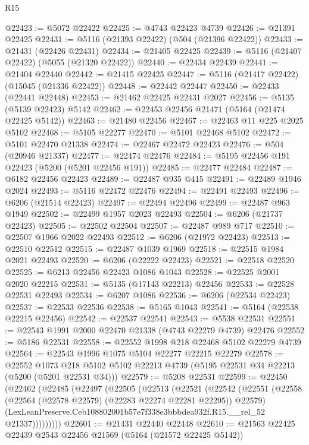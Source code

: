 \begin{lexlean}{R15}
\begin{coremodule}
{{{{{{{{{{{@22423 := @5072 @22422
@22425 := @4743 @22423 @4739
@22426 := @21391 @22425
@22431 := @5116 (@21393 @22422) (@504 (@21396 @22422))
@22433 := @21431 (@22426 @22431)
@22434 := @21405 @22425
@22439 := @5116 (@21407 @22422) (@5055 (@21320 @22422))
@22440 := @22434 @22439
@22441 := @21404 @22440
@22442 := @21415 @22425
@22447 := @5116 (@21417 @22422) (@15045 (@21336 @22422))
@22448 := @22442 @22447
@22450 := @22433 (@22441 @22448)
@22453 := @21462 @22425 @22431 @2027
@22456 := @5135 (@5139 @22423) @5142
@22462 := @22453 @22456 @21471 (@5164 (@21474 @22425 @5142))
@22463 := @21480 @22456
@22467 := @22463 @11 @225 @2025 @5102
@22468 := @5105 @22277
@22470 := @5101 @22468 @5102
@22472 := @5101 @22470 @21338
@22474 := @22467 @22472 @22423
@22476 := @504 (@20946 @21337)
@22477 := @22474 @22476
@22484 := @5195 @22456 @191 @22423 (@5200 (@5201 @22456 @191))
@22485 := @22477 @22484
@22487 := @6182 @22456 @22423
@22489 := @22487 @935 @415
@22491 := @22489 @1946 @2024
@22493 := @5116 @22472 @22476
@22494 := @22491 @22493
@22496 := @6206 (@21514 @22423)
@22497 := @22494 @22496
@22499 := @22487 @963 @1949
@22502 := @22499 @1957 @2023 @22493
@22504 := @6206 (@21737 @22423)
@22505 := @22502 @22504
@22507 := @22487 @989 @717
@22510 := @22507 @1966 @2022 @22493
@22512 := @6206 (@21972 @22423)
@22513 := @22510 @22512
@22515 := @22487 @1039 @1969
@22518 := @22515 @1984 @2021 @22493
@22520 := @6206 (@22222 @22423)
@22521 := @22518 @22520
@22525 := @6213 @22456 @22423 @1086 @1043
@22528 := @22525 @2001 @2020 @22215
@22531 := @5135 (@17143 @22213) @22456
@22533 := @22528 @22531 @22493
@22534 := @6207 @1086
@22536 := @6206 (@22534 @22423)
@22537 := @22533 @22536
@22538 := @5165 @1043
@22541 := @5164 (@22538 @22215 @22456)
@22542 := @22537 @22541
@22543 := @5538 @22531
@22551 := @22543 @1991 @2000 @22470 @21338 (@4743 @22279 @4739) @22476
@22552 := @5186 @22531
@22558 := @22552 @1998 @218 @22468 @5102 @22279 @4739
@22564 := @22543 @1996 @1075 @5104 @22277 @22215 @22279
@22578 := @22552
    @1073
    @218
    @5102
    @5102
    @22213
    @4739
    (@5195 @22531 @34 @22213 (@5200 (@5201 @22531 @34)))
@22579 := @5208 @22531
@22599 := @22450
    (@22462
      (@22485
        (@22497
          (@22505
            (@22513
              (@22521
                (@22542
                  (@22551
                    (@22558 (@22564 (@22578 @22579) (@22283 @22274 @22281 @22295)) @22579)
                    (LexLeanPreserve.Ceb108802001b57e7f338e3bbbdea932f.R15.__rel_52 @21337)))))))))
@22601 := @21431 @22440 @22448
@22610 := @21563 @22425 @22439 @2543 @22456 @21569 (@5164 (@21572 @22425 @5142))
}}}}}}}}}}}
\end{coremodule}
\end{lexlean}
